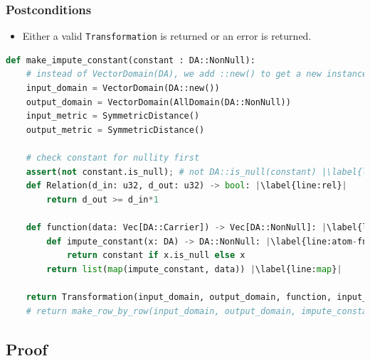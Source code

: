 \documentclass[11pt,a4paper]{article}
\newcommand{\grace}[1]{{ {\color{purple}{(grace)~#1}}}}
\begin{document}
\subsubsection*{Postconditions}

\begin{itemize}
    \item Either a valid \texttt{Transformation} is returned or an error is returned.
\end{itemize}


\begin{lstlisting}[language=Python,  escapechar=|]
def make_impute_constant(constant : DA::NonNull):
    # instead of VectorDomain(DA), we add ::new() to get a new instance of DA. This is bcause DA has the ImputableDomain trait. Discuss among interns.
    input_domain = VectorDomain(DA::new())
    output_domain = VectorDomain(AllDomain(DA::NonNull))
    input_metric = SymmetricDistance()
    output_metric = SymmetricDistance()
    
    # check constant for nullity first
    assert(not constant.is_null); # not DA::is_null(constant) |\label{line:null}|
    def Relation(d_in: u32, d_out: u32) -> bool: |\label{line:rel}|
        return d_out >= d_in*1

    def function(data: Vec[DA::Carrier]) -> Vec[DA::NonNull]: |\label{line:fn}|
        def impute_constant(x: DA) -> DA::NonNull: |\label{line:atom-fn}|
            return constant if x.is_null else x
        return list(map(impute_constant, data)) |\label{line:map}|
        
    return Transformation(input_domain, output_domain, function, input_metric, output_metric, stability_relation=Relation)
    # return make_row_by_row(input_domain, output_domain, impute_constant);
\end{lstlisting}

\grace{ Will need to change pseudocode so that it returns the result of a make row by row transformation (which the code does) instead of a Transformation directly.}

\subsection{Proof}
\grace{Should this go in the proofs list?}
\grace{I'm also confused why we have implementation of DA::NonNull but it doesn't do what the name says. Seems pretty counter intuitive.}
\end{document}
